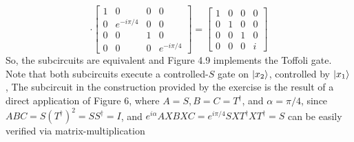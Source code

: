 $$\cdot\begin{bmatrix} 1 & 0 & 0 &0 \\ 0 & e^{-i\pi/4} & 0 & 0 \\ 0 & 0 & 1 & 0 \\ 0 & 0 & 0 & e^{-i\pi/4}\end{bmatrix} = \begin{bmatrix} 1 & 0 & 0 &0 \\ 0 & 1 & 0 & 0 \\ 0 & 0 & 1 & 0 \\ 0 & 0 & 0 & i\end{bmatrix}$$
So, the subcircuits are equivalent and Figure 4.9 implements the Toffoli gate.  Note that both subcircuits execute a controlled-$S$ gate on $\ket{x_2}$, controlled by $\ket{x_1}$,  The subcircuit in the construction provided by the exercise is the result of a direct application of Figure 6, where $A=S, B=C=T^\dagger$, and $\alpha =\pi/4$, since $ABC=S(T^\dagger)^2=SS^\dagger=I$, and $e^{i\alpha}AXBXC=e^{i\pi/4}SXT^\dagger XT^\dagger= S$ can be easily verified via matrix-multiplication

